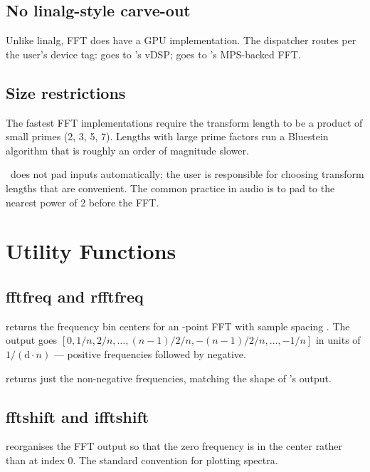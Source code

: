 \subsection{No linalg-style carve-out}
\label{ssec:fft:no_carveout}

Unlike linalg, FFT does have a GPU implementation. The
dispatcher routes per the user's device tag:
 goes to \Accelerate's vDSP; 
goes to \MLX's MPS-backed FFT.

\subsection{Size restrictions}
\label{ssec:fft:size_restrictions}

The fastest FFT implementations require the transform length to
be a product of small primes (2, 3, 5, 7). Lengths with large
prime factors run a Bluestein algorithm that is roughly an order
of magnitude slower.

\Lucid\ does not pad inputs automatically; the user is
responsible for choosing transform lengths that are convenient.
The common practice in audio is to pad to the nearest power of
2 before the FFT.

\section{Utility Functions}
\label{sec:fft:utilities}

\subsection{fftfreq and rfftfreq}
\label{ssec:fft:freq_utilities}

 returns the frequency bin centers for
an -point FFT with sample spacing . The output
goes $[0, 1/n, 2/n, \ldots, (n-1)/2/n, -(n-1)/2/n, \ldots, -1/n]$
in units of $1/(\text{d} \cdot n)$ --- positive frequencies
followed by negative.

 returns just the non-negative
frequencies, matching the shape of 's output.

\subsection{fftshift and ifftshift}
\label{ssec:fft:shift_utilities}

 reorganises the FFT output so that the zero
frequency is in the center rather than at index 0. The standard
convention for plotting spectra.

